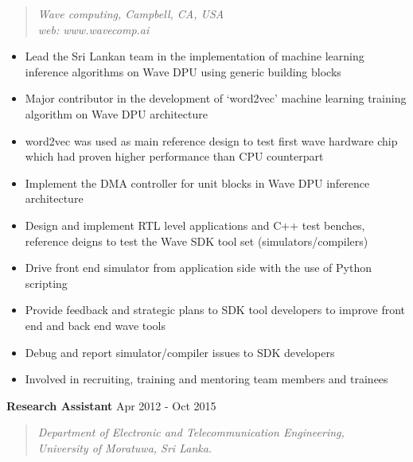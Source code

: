 \documentclass[mm]{res} %
\begin{document}
\begin{resume}
\begin{quote}
	\emph{Wave computing, Campbell, CA, USA\\
		  web: www.wavecomp.ai}
\end{quote}
\begin{itemize} \itemsep -1pt 
	\item Lead the Sri Lankan team in the implementation of machine learning inference algorithms on Wave DPU using generic building blocks
	\item Major contributor in the development of `word2vec' machine learning training algorithm on Wave DPU architecture
	\item word2vec was used as main reference design to test first wave hardware chip which had proven higher performance than CPU counterpart
	\item Implement the DMA controller for unit blocks in Wave DPU inference architecture
	\item Design and implement RTL level applications and C++ test benches, reference deigns to test the Wave SDK tool set (simulators/compilers)
	\item Drive front end simulator from application side with the use of Python scripting
	\item Provide feedback and strategic plans to SDK tool developers to improve front end and back end wave tools
	\item Debug and report simulator/compiler issues to SDK developers
	\item Involved in recruiting, training and mentoring team members and trainees
\end{itemize}

\textbf{Research Assistant} \hfill Apr 2012 - Oct 2015
\begin{quote}
	\emph{Department of Electronic and Telecommunication Engineering, \\
		University of Moratuwa, Sri Lanka.}
\end{quote}



\end{resume}
\end{document}
